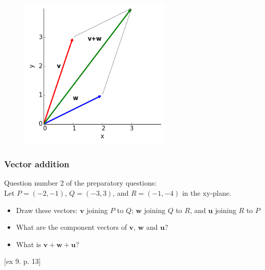\documentclass{beamer}
\begin{document}
\begin{frame}

\begin{figure}[htbp]
\begin{center}
 \includegraphics[width=0.65\textwidth]{figure2b.png}
\caption{}
\end{center}
\end{figure}

\end{frame}

\begin{frame}
\frametitle{Vector addition}
Question number 2 of the preparatory questions:\\[1cm]
Let $P = (-2,-1)$, $Q = (-3,3)$, and $R = (-1,-4)$ in the xy-plane.\\
\begin{itemize}
\item Draw these vectors: $\mathbf{v}$ joining $P$ to $Q$; $\mathbf{w}$  joining $Q$ to $R$, and $\mathbf{u}$  joining $R$ to $P$
\item What are the component vectors of $\mathbf{v}$, $\mathbf{w}$ and $\mathbf{u}$?
\item What is $\mathbf{v + w + u}$?
\end{itemize}
[ex 9. p. 13]
\end{frame}
\end{document}
